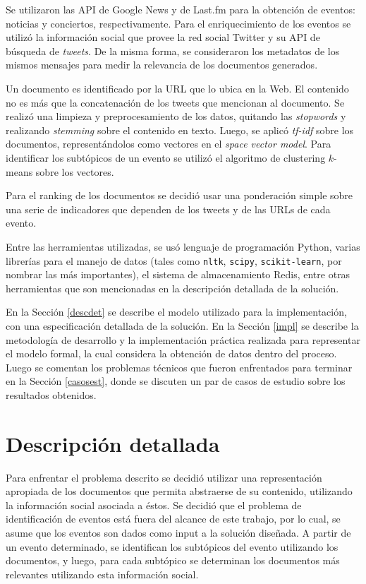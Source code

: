   Se utilizaron las API de Google News y de Last.fm para la
  obtención de eventos: noticias y conciertos, respectivamente. Para
  el enriquecimiento de los eventos se utilizó la información social
  que provee la red social Twitter y su API de búsqueda de
  \emph{tweets}. De la misma forma, se consideraron los metadatos de los
  mismos mensajes para medir la relevancia de los documentos generados.

  Un documento es identificado por la URL que lo ubica en la Web. El
  contenido no es más que la concatenación de los tweets que
  mencionan al documento. Se realizó una limpieza y preprocesamiento
  de los datos, quitando las \emph{stopwords} y realizando \emph{stemming}
  sobre el contenido en texto. Luego, se aplicó \emph{tf-idf} sobre los
  documentos, representándolos como vectores en el \emph{space vector   model}. Para identificar los subtópicos de un evento se utilizó el
  algoritmo de clustering $k$-means sobre los vectores.

  Para el ranking de los documentos se decidió usar una ponderación
  simple sobre una serie de indicadores que dependen de los tweets y
  de las URLs de cada evento.

  Entre las herramientas utilizadas, se usó lenguaje de
  programación Python, varias librerías para el manejo de datos
  (tales como \texttt{nltk}, \texttt{scipy}, \texttt{scikit-learn}, por nombrar las más
  importantes), el sistema de almacenamiento Redis, entre otras
  herramientas que son mencionadas en la descripción detallada de la
  solución.

  En la Sección \ref{descdet} se describe el modelo utilizado para la
  implementación, con una especificación detallada de la solución. En la
  Sección \ref{impl} se describe la metodología de desarrollo y la
  implementación práctica realizada para representar el modelo
  formal, la cual considera la obtención de datos dentro del
  proceso. Luego se comentan los problemas técnicos que fueron
  enfrentados para terminar en la Sección \ref{casosest}, donde se discuten
  un par de casos de estudio sobre los resultados obtenidos.


\section{Descripción detallada}
\label{sec-4.1}

\label{descdet}


   Para enfrentar el problema descrito se decidió utilizar una
   representación apropiada de los documentos que permita abstraerse
   de su contenido, utilizando la información social asociada a
   éstos. Se decidió que el problema de identificación de eventos está
   fuera del alcance de este trabajo, por lo cual, se asume que los
   eventos son dados como input a la solución diseñada. A partir de un
   evento determinado, se identifican los  subtópicos del evento
   utilizando los documentos, y luego, para cada
   subtópico se determinan los documentos más relevantes utilizando
   esta información social.

